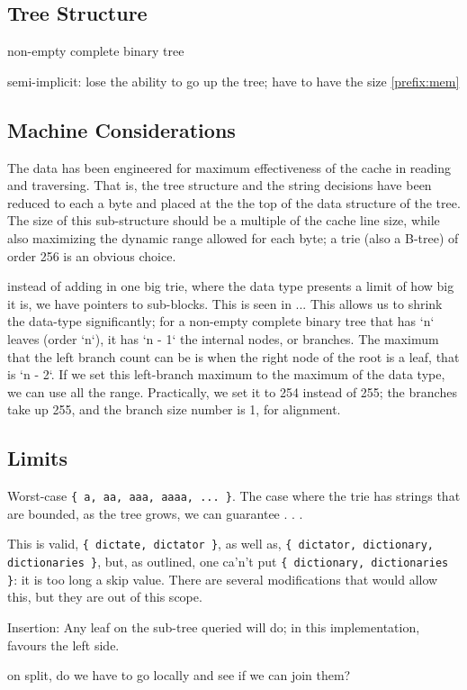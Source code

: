 \documentclass{article}
\newcommand{\code}[1]{\colorbox{light-gray}{\texttt{#1}}}
\begin{document}
\subsection{Tree Structure}

non-empty complete binary tree

semi-implicit: lose the ability to go up the tree; have to have the size \ref{prefix:mem}

\subsection{Machine Considerations}

The data has been engineered for maximum effectiveness of the cache in reading and traversing. That is, the tree structure and the string decisions have been reduced to each a byte and placed at the the top of the data structure of the tree. The size of this sub-structure should be a multiple of the cache line size, while also maximizing the dynamic range allowed for each byte; a trie (also a B-tree) of order 256 is an obvious choice.

instead of adding in one big trie, where the data type presents a limit of how big it is, we have pointers to sub-blocks. This is seen in ... This allows us to shrink the data-type significantly; for a non-empty complete binary tree that has `n` leaves (order `n`), it has `n - 1` the internal nodes, or branches. The maximum that the left branch count can be is when the right node of the root is a leaf, that is `n - 2`. If we set this left-branch maximum to the maximum of the data type, we can use all the range. Practically, we set it to 254 instead of 255; the branches take up 255, and the branch size number is 1, for alignment.

\subsection{Limits}

Worst-case \code{\{ a, aa, aaa, aaaa, ... \}}. The case where the trie has strings that are bounded, as the tree grows, we can guarantee . . .

This is valid, \code{\{ dictate, dictator \}}, as well as, \code{\{ dictator, dictionary, dictionaries \}}, but, as outlined, one ca'n't put \code{\{ dictionary, dictionaries \}}: it is too long a skip value. There are several modifications that would allow this, but they are out of this scope.

Insertion: Any leaf on the sub-tree queried will do; in this implementation, favours the left side.

on split, do we have to go locally and see if we can join them?


\end{document}
